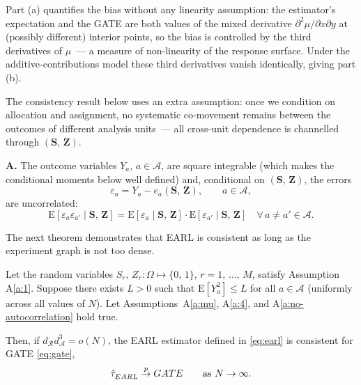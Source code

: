 \documentclass[sigconf,anonymous,review]{acmart}
\newcounter{assumption}
\newenvironment{assumption}{\refstepcounter{assumption}\par\medskip\noindent\textbf{A\theassumption.}\enspace}{\par\medskip}
\newcommand{\E}{\mathrm E}
\begin{document}
Part (a) quantifies the bias without any linearity assumption: the estimator's expectation and the GATE are both values of the mixed derivative $\partial^2\mu/\partial x\partial y$ at (possibly different) interior points, so the bias is controlled by the third derivatives of $\mu$~--- a measure of non-linearity of the response surface. Under the additive-contributions model these third derivatives vanish identically, giving part (b).

The consistency result below uses an extra assumption: once we condition on allocation and assignment, no systematic co-movement remains between the outcomes of different analysis units~--- all cross-unit dependence is channelled through $(\mathbf S,\,\mathbf Z)$.

\begin{assumption}\label{a:no-autocorrelation} The outcome variables $Y_a$, $a\in\mathcal A$, are square integrable (which makes the conditional moments below well defined) and, conditional on $(\mathbf S,\,\mathbf Z)$, the errors
\begin{equation}\label{def:epsa}
    \varepsilon_a = Y_a - e_a(\mathbf{S},\,\mathbf{Z}),\qquad a\in\mathcal{A},
\end{equation}
are uncorrelated:
\begin{equation*}
    \E[\varepsilon_a \varepsilon_{a'}\mid \mathbf{S},\,\mathbf{Z}] = \E[\varepsilon_a\mid \mathbf{S},\,\mathbf{Z}] \cdot \E[\varepsilon_{a'}\mid \mathbf{S},\,\mathbf{Z}]\quad \forall\,a\neq a'\in\mathcal{A}.
\end{equation*}
\end{assumption}

The next theorem demonstrates that EARL is consistent as long as the experiment graph is not too dense.
\begin{theorem}\label{th:consistency}
    Let the random variables $S_r,\,Z_r\colon\Omega\mapsto\{0,\,1\}$, $r=1,\,\ldots,\,M$, satisfy Assumption A\ref{a:1}. Suppose there exists $L>0$ such that $\E[Y_a^2] \le L$ for all $a\in\mathcal A$ (uniformly across all values of $N$). Let Assumptions~A\ref{a:mu}, A\ref{a:4}, and A\ref{a:no-autocorrelation} hold true.

    Then, if $d^{\phantom{1}}_{\mathcal{R}}d^3_{\mathcal{A}}=o(N)$, the EARL estimator defined in \eqref{eq:earl} is consistent for GATE \eqref{eq:gate},
    \begin{equation*}
        \hat\tau^{\phantom{1}}_{EARL} \stackrel{p}{\to} GATE\qquad \textup{as }N\to\infty.
    \end{equation*}
\end{theorem}
\end{document}
